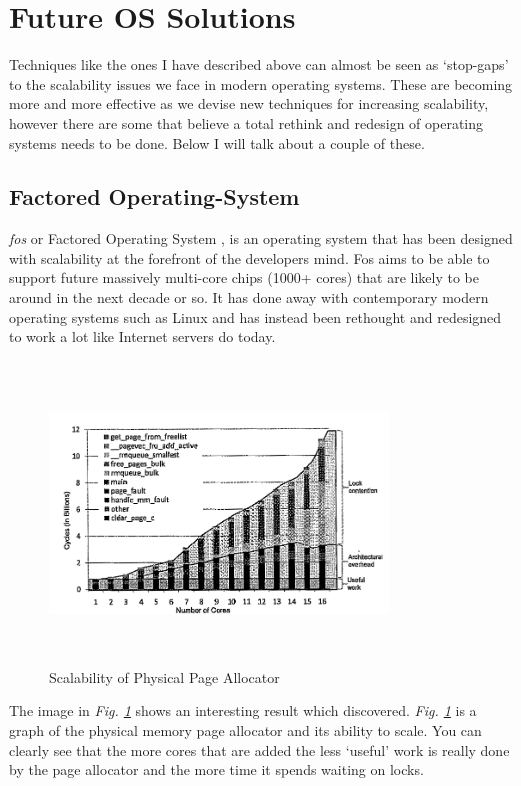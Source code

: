 \documentclass[journal]{IEEEtran}
\begin{document}
\section{Future OS Solutions}

Techniques like the ones I have described above can almost be seen as `stop-gaps' to the scalability issues we face in modern operating systems. These are becoming more and more effective as we devise new techniques for increasing scalability, however there are some that believe a total rethink and redesign of operating systems needs to be done. Below I will talk about a couple of these.

\subsection{Factored Operating-System}

\emph{fos} or Factored Operating System \cite{fos}, is an operating system that has been designed with scalability at the forefront of the developers mind. Fos aims to be able to support future massively multi-core chips (1000+ cores) that are likely to be around in the next decade or so. It has done away with contemporary modern operating systems such as Linux and has instead been rethought and redesigned to work a lot like Internet servers do today.

\begin{figure}
\includegraphics[width =9cm, height =8cm]{image.png}
\caption{Scalability of Physical Page Allocator}
\label{PageAllocator}
\end{figure}

The image in \emph{Fig. \ref{PageAllocator}} shows an interesting result which \cite{fos} discovered. \emph{Fig. \ref{PageAllocator}} is a graph of the physical memory page allocator and its ability to scale. You can clearly see that the more cores that are added the less `useful' work is really done by the page allocator and the more time it spends waiting on locks. 
\end{document}
